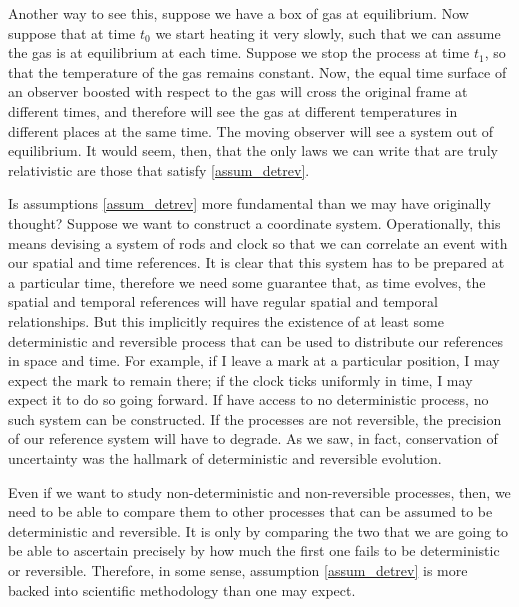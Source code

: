 Another way to see this, suppose we have a box of gas at equilibrium. Now suppose that at time $t_0$ we start heating it very slowly, such that we can assume the gas is at equilibrium at each time. Suppose we stop the process at time $t_1$, so that the temperature of the gas remains constant. Now, the equal time surface of an observer boosted with respect to the gas will cross the original frame at different times, and therefore will see the gas at different temperatures in different places at the same time. The moving observer will see a system out of equilibrium. It would seem, then, that the only laws we can write that are truly relativistic are those that satisfy \ref{assum_detrev}.

Is assumptions \ref{assum_detrev} more fundamental than we may have originally thought? Suppose we want to construct a coordinate system. Operationally, this means devising a system of rods and clock so that we can correlate an event with our spatial and time references. It is clear that this system has to be prepared at a particular time, therefore we need some guarantee that, as time evolves, the spatial and temporal references will have regular spatial and temporal relationships. But this implicitly requires the existence of at least some deterministic and reversible process that can be used to distribute our references in space and time. For example, if I leave a mark at a particular position, I may expect the mark to remain there; if the clock ticks uniformly in time, I may expect it to do so going forward. If have access to no deterministic process, no such system can be constructed. If the processes are not reversible, the precision of our reference system will have to degrade. As we saw, in fact, conservation of uncertainty was the hallmark of deterministic and reversible evolution.

Even if we want to study non-deterministic and non-reversible processes, then, we need to be able to compare them to other processes that can be assumed to be deterministic and reversible. It is only by comparing the two that we are going to be able to ascertain precisely by how much the first one fails to be deterministic or reversible. Therefore, in some sense, assumption \ref{assum_detrev} is more backed into scientific methodology than one may expect.

